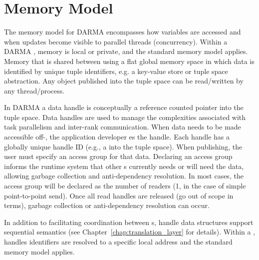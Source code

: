 
\section{Memory Model}
\label{sec:mem_model}
The memory model for \gls{DARMA} encompasses how variables are accessed %
  and when updates become visible to parallel threads (concurrency).  
Within a \gls{DARMA} , memory is local or private, and the
standard \CC{} memory model applies. 
Memory that is shared between  using a flat global memory space in
which data is identified by unique tuple identifiers, e.g. a \gls{key-value
  store} or \gls{tuple space} abstraction.  
Any object published into the \gls{tuple space} can be read/written by any thread/process. 

In \gls{DARMA} a data \gls{handle} is conceptually a \gls{reference counted pointer} into the
\gls{tuple space}.  Data \glspl{handle} are used to manage the
complexities associated with \gls{task parallelism} and inter-\gls{rank} communication.  
When data needs to be made accessible off-, the application developer 
es the \gls{handle}.  Each \gls{handle} has a globally unique handle ID
(e.g., a  into the \gls{tuple space}).  
When publishing, the user must specify an \gls{access group} for that data.  
Declaring an \gls{access group} informs the \gls{runtime system} that other
s currently needs or will need the data,  
allowing garbage collection and \gls{anti-dependency} resolution.
In most cases, the \gls{access group} will be declared as the number of readers (1, in the case of simple point-to-point send).
Once all read \glspl{handle} are released (go out of scope in \CC{} terms),
\gls{garbage collection} or \gls{anti-dependency} resolution can occur.


In addition to facilitating coordination between s, \gls{handle} data structures 
support \gls{sequential semantics} (see Chapter~\ref{chap:translation_layer} for details).
Within a ,  \glspl{handle} identifiers are resolved to a
specific local address and the standard \CC{} memory model applies.

